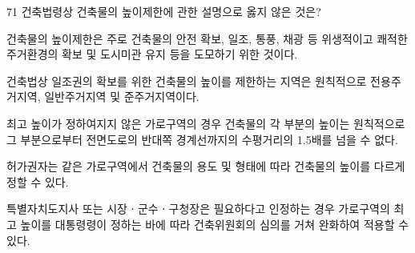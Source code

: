 \begin{question}{71}
건축법령상 건축물의 높이제한에 관한 설명으로 옳지 않은 것은?
\begin{choices}
  \item 건축물의 높이제한은 주로 건축물의 안전 확보, 일조, 통풍, 채광 등 위생적이고 쾌적한 주거환경의 확보 및 도시미관 유지 등을 도모하기 위한 것이다.
  \item 건축법상 일조권의 확보를 위한 건축물의 높이를 제한하는 지역은 원칙적으로 전용주거지역, 일반주거지역 및 준주거지역이다.
  \item 최고 높이가 정하여지지 않은 가로구역의 경우 건축물의 각 부분의 높이는 원칙적으로 그 부분으로부터 전면도로의 반대쪽 경계선까지의 수평거리의 1.5배를 넘을 수 없다.
  \item 허가권자는 같은 가로구역에서 건축물의 용도 및 형태에 따라 건축물의 높이를 다르게 정할 수 있다.
  \item 특별자치도지사 또는 시장ㆍ군수ㆍ구청장은 필요하다고 인정하는 경우 가로구역의 최고 높이를 대통령령이 정하는 바에 따라 건축위원회의 심의를 거쳐 완화하여 적용할 수 있다.
\end{choices}
\end{question}
